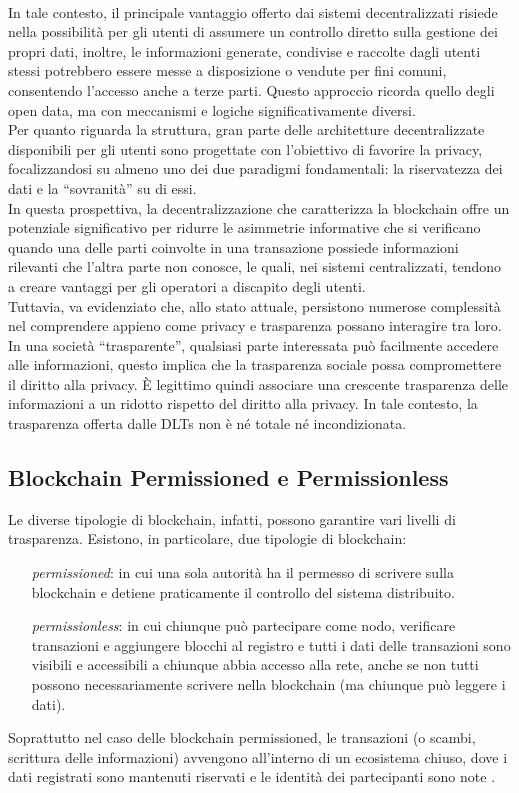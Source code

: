 \\In tale contesto, il principale vantaggio offerto dai sistemi decentralizzati risiede nella possibilità per gli utenti di assumere un controllo diretto sulla gestione dei propri dati, inoltre, le informazioni generate, condivise e raccolte dagli utenti stessi potrebbero essere messe a disposizione o vendute per fini comuni,
consentendo l'accesso anche a terze parti. Questo approccio ricorda quello degli open data, ma con meccanismi e logiche significativamente diversi.
\\Per quanto riguarda la struttura, gran parte delle architetture decentralizzate disponibili per gli utenti sono progettate con l'obiettivo di favorire la privacy, focalizzandosi su almeno uno dei due paradigmi fondamentali: la riservatezza dei dati e la “sovranità” su di essi.
\\In questa prospettiva, la decentralizzazione che caratterizza la blockchain offre un potenziale significativo per ridurre le asimmetrie informative che si verificano quando una delle parti coinvolte in una transazione possiede informazioni rilevanti che l'altra parte non conosce, le quali, nei sistemi centralizzati, tendono a creare vantaggi per gli operatori a discapito degli utenti.
\\Tuttavia, va evidenziato che, allo stato attuale, persistono numerose complessità nel comprendere appieno come privacy e trasparenza possano interagire tra loro.
In una società “trasparente”, qualsiasi parte interessata può facilmente accedere alle informazioni, questo implica che la trasparenza sociale possa compromettere il diritto alla privacy. \`E legittimo quindi associare una crescente trasparenza delle informazioni a un ridotto rispetto del diritto alla privacy.
In tale contesto, la trasparenza offerta dalle DLTs non è né totale né incondizionata. 
\subsection{Blockchain Permissioned e Permissionless}
Le diverse tipologie di blockchain, infatti, possono garantire vari livelli di trasparenza. Esistono, in particolare, due tipologie di blockchain: 
\begin{itemize}
    \item [\textit{permissioned}:] in cui una sola autorità ha il permesso di scrivere sulla blockchain e detiene praticamente il controllo del sistema distribuito.
    \item [\textit{permissionless}:] in cui chiunque può partecipare come nodo, verificare transazioni e aggiungere blocchi al registro e tutti i dati delle transazioni sono visibili e accessibili a chiunque abbia accesso alla rete, anche se non tutti possono necessariamente scrivere nella blockchain (ma chiunque può leggere i dati).
\end{itemize}
Soprattutto nel caso delle blockchain permissioned, le transazioni (o scambi, scrittura delle informazioni) avvengono all’interno di un ecosistema chiuso, dove i dati registrati sono mantenuti riservati e le identità dei partecipanti sono note \cite{Blockchain_tecnologia_e_applicazioni_per_il_business}.
